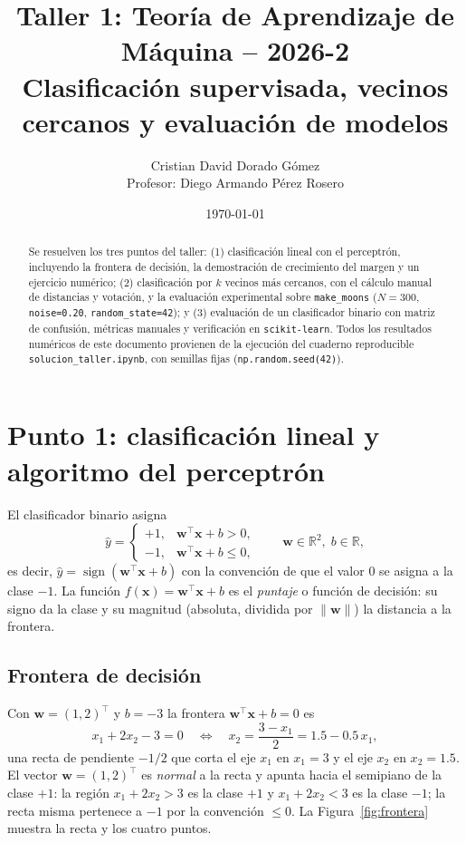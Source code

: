 \documentclass[11pt,a4paper]{article}
\title{\textbf{Taller 1: Teoría de Aprendizaje de Máquina -- 2026-2}\\[4pt]
\large Clasificación supervisada, vecinos cercanos y evaluación de modelos}
\author{Cristian David Dorado Gómez\\[2pt]
\small Profesor: Diego Armando Pérez Rosero}
\date{\today}
\newcommand{\R}{\mathbb{R}}
\newcommand{\x}{\mathbf{x}}
\newcommand{\w}{\mathbf{w}}
\newcommand{\yhat}{\hat y}
\begin{document}
\maketitle

\begin{abstract}
\noindent
Se resuelven los tres puntos del taller: (1) clasificación lineal con el
perceptrón, incluyendo la frontera de decisión, la demostración de crecimiento
del margen y un ejercicio numérico; (2) clasificación por $k$ vecinos más
cercanos, con el cálculo manual de distancias y votación, y la evaluación
experimental sobre \texttt{make\_moons} ($N=300$, \texttt{noise=0.20},
\texttt{random\_state=42}); y (3) evaluación de un clasificador binario con
matriz de confusión, métricas manuales y verificación en \texttt{scikit-learn}.
Todos los resultados numéricos de este documento provienen de la ejecución del
cuaderno reproducible \texttt{solucion\_taller.ipynb}, con semillas fijas
(\texttt{np.random.seed(42)}).
\end{abstract}

\tableofcontents
\vspace{0.5cm}

\section{Punto 1: clasificación lineal y algoritmo del perceptrón}

El clasificador binario asigna
\begin{equation}
\yhat =
\begin{cases}
+1, & \w^\top \x + b > 0,\\
-1, & \w^\top \x + b \le 0,
\end{cases}
\qquad \w \in \R^2,\; b \in \R ,
\end{equation}
es decir, $\yhat = \operatorname{sign}(\w^\top \x + b)$ con la convención de que el
valor $0$ se asigna a la clase $-1$. La función $f(\x) = \w^\top \x + b$ es el
\emph{puntaje} o función de decisión: su signo da la clase y su magnitud
(absoluta, dividida por $\lVert \w \rVert$) la distancia a la frontera.

\subsection{Frontera de decisión}

Con $\w = (1,2)^\top$ y $b = -3$ la frontera $\w^\top \x + b = 0$ es
\begin{equation}
x_1 + 2x_2 - 3 = 0
\quad\Longleftrightarrow\quad
x_2 = \frac{3 - x_1}{2} = 1.5 - 0.5\,x_1 ,
\end{equation}
una recta de pendiente $-1/2$ que corta el eje $x_1$ en $x_1 = 3$ y el eje $x_2$
en $x_2 = 1.5$. El vector $\w = (1,2)^\top$ es \emph{normal} a la recta y apunta
hacia el semipiano de la clase $+1$: la región $x_1 + 2x_2 > 3$ es la clase $+1$
y $x_1 + 2x_2 < 3$ es la clase $-1$; la recta misma pertenece a $-1$ por la
convención $\le 0$. La Figura~\ref{fig:frontera} muestra la recta y los cuatro
puntos.
\end{document}
